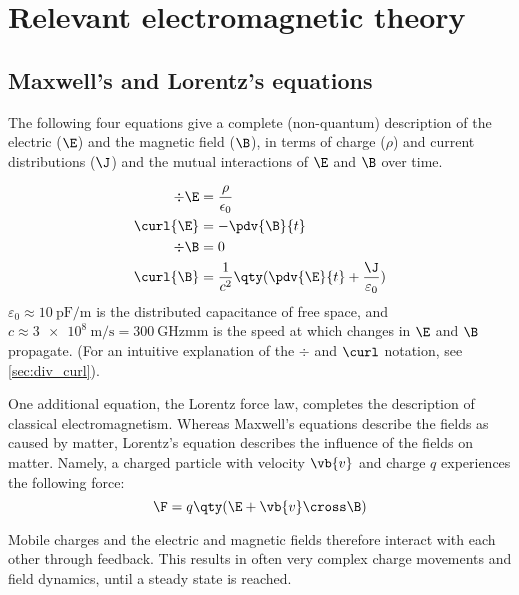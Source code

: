 
\chapter{Relevant electromagnetic theory}
\label{appendix_maxwell}


\section{Maxwell's and Lorentz's equations}

The following four equations give a complete (non-quantum\footnotemark{})
description of the electric ($\E$) and the magnetic field ($\B$), in terms of
charge ($\rho$) and current distributions ($\J$) and the mutual interactions
of $\E$ and $\B$ over time.


\begin{align}
\div{\E} &= \frac{\rho}{\epsilon_0} \\
\curl{\E} &= -\pdv{\B}{t} \\
\div{\B} &= 0 \\
\curl{\B} &= \frac{1}{c^2} \qty( \pdv{\E}{t} + \frac{\J}{\varepsilon_0} )
\end{align}
%
$\varepsilon_0 \approx \SI{10}{\pF\per\m}$ is the distributed capacitance of
free space, and $c \approx \SI{3e8}{\m\per\s} = \SI{300}{\GHz\mm}$ is the
speed at which changes in $\E$ and $\B$ propagate. (For an intuitive explanation of the $\div$ and $\curl$ notation, see \cref{sec:div_curl}).


One additional equation, the Lorentz force law, completes the description of
classical electromagnetism. Whereas Maxwell's equations describe the fields
as caused by matter, Lorentz's equation describes the influence of the fields
on matter. Namely, a charged particle with velocity $\vb{v}$ and charge $q$
experiences the following force:
\begin{equation}
\F = q \qty(\E + \vb{v} \cross \B)
\end{equation}

Mobile charges and the electric and magnetic fields therefore interact with
each other through feedback. This results in often very complex charge
movements and field dynamics, until a steady state is reached.





